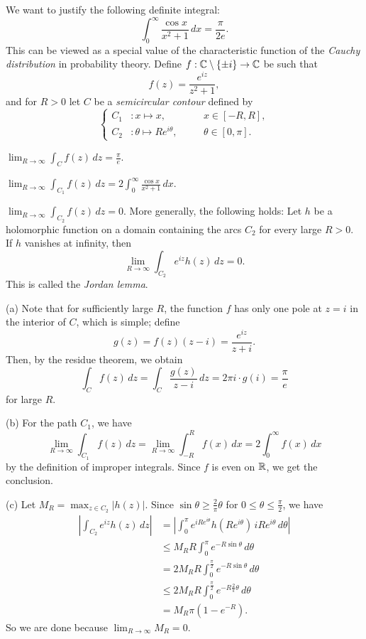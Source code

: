 \documentclass{../note}
\begin{document}
\begin{prb}
We want to justify the following definite integral:
\[\int_0^\infty\frac{\cos x}{x^2+1}\,dx=\frac\pi{2e}.\]
This can be viewed as a special value of the characteristic function of the \emph{Cauchy distribution} in probability theory.
Define $f:\mathbb{C}\setminus\{\pm i\}\to\mathbb{C}$ be such that
\[f(z)=\frac{e^{iz}}{z^2+1},\]
and for $R>0$ let $C$ be a \emph{semicircular contour} defined by
\[\left\{
\begin{alignedat}{2}
C_1&:x\mapsto x,&\quad&x\in[-R,R],\\
C_2&:\theta\mapsto Re^{i\theta},&&\theta\in[0,\pi].
\end{alignedat}
\right.\]
\begin{parts}
\item $\lim_{R\to\infty}\int_Cf(z)\,dz=\frac\pi e$.
\item $\lim_{R\to\infty}\int_{C_1}f(z)\,dz=2\int_0^\infty\frac{\cos x}{x^2+1}\,dx$.
\item $\lim_{R\to\infty}\int_{C_2}f(z)\,dz=0$. More generally, the following holds: Let $h$ be a holomorphic function on a domain containing the arcs $C_2$ for every large $R>0$.
If $h$ vanishes at infinity, then
\[\lim_{R\to\infty}\int_{C_2}e^{iz}h(z)\,dz=0.\]
This is called the \emph{Jordan lemma}.
\end{parts}
\end{prb}
\begin{pf}
(a)
Note that for sufficiently large $R$, the function $f$ has only one pole at $z=i$ in the interior of $C$, which is simple; define
\[g(z)=f(z)(z-i)=\frac{e^{iz}}{z+i}.\]
Then, by the residue theorem, we obtain
\[\int_Cf(z)\,dz=\int_C\frac{g(z)}{z-i}\,dz=2\pi i\cdot g(i)=\frac\pi e\]
for large $R$.

(b)
For the path $C_1$, we have
\[\lim_{R\to\infty}\int_{C_1}f(z)\,dz=\lim_{R\to\infty}\int_{-R}^Rf(x)\,dx=2\int_0^\infty f(x)\,dx\]
by the definition of improper integrals.
Since $f$ is even on $\mathbb{R}$, we get the conclusion.

(c)
Let $M_R=\max_{z\in C_2}|h(z)|$.
Since $\sin\theta\ge\frac2\pi\theta$ for $0\le\theta\le\frac\pi2$, we have
\begin{align*}
|\int_{C_2}e^{iz}h(z)\,dz|
&=|\int_0^\pi e^{iRe^{i\theta}}h(Re^{i\theta})\,iRe^{i\theta}\,d\theta|\\
&\le M_RR\int_0^\pi e^{-R\sin\theta}\,d\theta\\
&=2M_RR\int_0^{\frac\pi2}e^{-R\sin\theta}\,d\theta\\
&\le2M_RR\int_0^{\frac\pi2}e^{-R\frac2\pi\theta}\,d\theta\\\
&=M_R\pi(1-e^{-R}).
\end{align*}
So we are done because $\lim_{R\to\infty}M_R=0$.
\end{pf}
\end{document}

